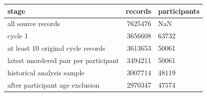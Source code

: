 \begin{tabular}{lrl}
\toprule
stage & records & participants \\
\midrule
all source records & 7625476 & NaN \\
cycle 1 & 3656608 & 63732 \\
at least 10 original cycle records & 3613653 & 50061 \\
latest unordered pair per participant & 3494211 & 50061 \\
historical analysis sample & 3007714 & 48119 \\
after participant age exclusion & 2970347 & 47574 \\
\bottomrule
\end{tabular}
